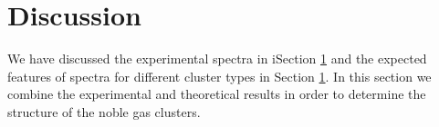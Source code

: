 \section{Discussion}

We have discussed the experimental spectra in iSection \ref{} and
the expected features of spectra for different cluster types in
Section \ref{}. In this section we combine the experimental and theoretical
results in order to determine the structure of the noble gas clusters.

